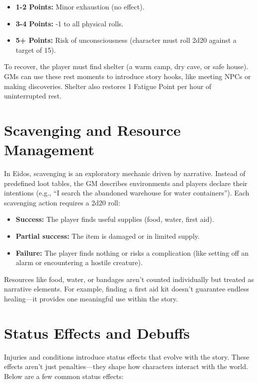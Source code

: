 \begin{itemize}
    \item \textbf{1-2 Points:} Minor exhaustion (no effect).
    \item \textbf{3-4 Points:} -1 to all physical rolls.
    \item \textbf{5+ Points:} Risk of unconsciousness (character must roll 2d20 against a target of 15).
\end{itemize}

To recover, the player must find shelter (a warm camp, dry cave, or safe house). GMs can use these rest moments to introduce story hooks, like meeting NPCs or making discoveries. Shelter also restores 1 Fatigue Point per hour of uninterrupted rest.

\section{Scavenging and Resource Management}

In Eidos, scavenging is an exploratory mechanic driven by narrative. Instead of predefined loot tables, the GM describes environments and players declare their intentions (e.g., “I search the abandoned warehouse for water containers”). Each scavenging action requires a 2d20 roll:

\begin{itemize}
    \item \textbf{Success:} The player finds useful supplies (food, water, first aid).
    \item \textbf{Partial success:} The item is damaged or in limited supply.
    \item \textbf{Failure:} The player finds nothing or risks a complication (like setting off an alarm or encountering a hostile creature).
\end{itemize}

Resources like food, water, or bandages aren’t counted individually but treated as narrative elements. For example, finding a first aid kit doesn’t guarantee endless healing—it provides one meaningful use within the story.

\section{Status Effects and Debuffs}

Injuries and conditions introduce status effects that evolve with the story. These effects aren’t just penalties—they shape how characters interact with the world. Below are a few common status effects:

